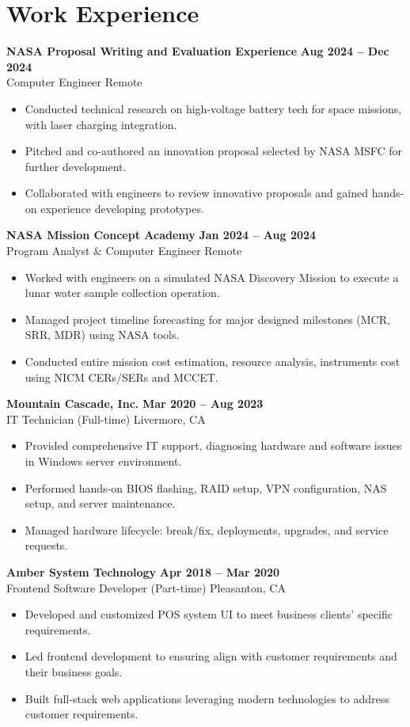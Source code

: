 \documentclass[letterpaper,11pt]{article}
\begin{document}
\section*{Work Experience}
\textbf{NASA Proposal Writing and Evaluation Experience} \hfill \textbf{Aug 2024 -- Dec 2024} \\
Computer Engineer  \hfill Remote
\begin{itemize}
    \item Conducted technical research on high-voltage battery tech for space missions, with laser charging integration.
    \item Pitched and co-authored an innovation proposal selected by NASA MSFC for further development.
    \item Collaborated with engineers to review innovative proposals and gained hands-on experience developing prototypes.
\end{itemize}
\vspace{4mm}
\textbf{NASA Mission Concept Academy} \hfill \textbf{Jan 2024 -- Aug 2024} \\
Program Analyst \& Computer Engineer \hfill Remote
\begin{itemize}
    \item Worked with engineers on a simulated NASA Discovery Mission to execute a lunar water sample collection operation.
    \item Managed project timeline forecasting for major designed milestones (MCR, SRR, MDR) using NASA tools.
    \item Conducted entire mission cost estimation, resource analysis, instruments cost using NICM CERs/SERs and MCCET.
\end{itemize}
\vspace{4mm}
\textbf{Mountain Cascade, Inc.} \hfill \textbf{Mar 2020 -- Aug 2023} \\
IT Technician (Full-time) \hfill Livermore, CA
\begin{itemize}
    \item Provided comprehensive IT support, diagnosing hardware and software issues in Windows server environment.
    \item Performed hands-on BIOS flashing, RAID setup, VPN configuration, NAS setup, and server maintenance.
    \item Managed hardware lifecycle: break/fix, deployments, upgrades, and service requests.
\end{itemize}
\vspace{4mm}
\textbf{Amber System Technology} \hfill \textbf{Apr 2018 -- Mar 2020} \\
Frontend Software Developer (Part-time) \hfill Pleasanton, CA
\begin{itemize}
    \item Developed and customized POS system UI to meet business clients’ specific requirements.
    \item Led frontend development to ensuring align with customer requirements and their business goals.
    \item Built full-stack web applications leveraging modern technologies to address customer requirements.
\end{itemize}
\end{document}
